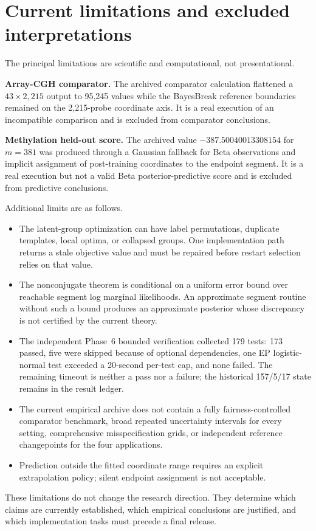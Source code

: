 \section{Current limitations and excluded interpretations}
\label{sec:exec-limitations}

The principal limitations are scientific and computational, not presentational.

\begin{cautionbox}
\textbf{Array-CGH comparator.} The archived comparator calculation flattened a $43\times 2{,}215$ output to 95,245 values while the BayesBreak reference boundaries remained on the 2,215-probe coordinate axis. It is a real execution of an incompatible comparison and is excluded from comparator conclusions.

\textbf{Methylation held-out score.} The archived value $-387.50040013308154$ for $m=381$ was produced through a Gaussian fallback for Beta observations and implicit assignment of post-training coordinates to the endpoint segment. It is a real execution but not a valid Beta posterior-predictive score and is excluded from predictive conclusions.
\end{cautionbox}

Additional limits are as follows.
\begin{itemize}
  \item The latent-group optimization can have label permutations, duplicate templates, local optima, or collapsed groups. One implementation path returns a stale objective value and must be repaired before restart selection relies on that value.
  \item The nonconjugate theorem is conditional on a uniform error bound over reachable segment log marginal likelihoods. An approximate segment routine without such a bound produces an approximate posterior whose discrepancy is not certified by the current theory.
  \item The independent Phase~6 bounded verification collected 179 tests: 173 passed, five were skipped because of optional dependencies, one EP logistic-normal test exceeded a 20-second per-test cap, and none failed. The remaining timeout is neither a pass nor a failure; the historical 157/5/17 state remains in the result ledger.
  \item The current empirical archive does not contain a fully fairness-controlled comparator benchmark, broad repeated uncertainty intervals for every setting, comprehensive misspecification grids, or independent reference changepoints for the four applications.
  \item Prediction outside the fitted coordinate range requires an explicit extrapolation policy; silent endpoint assignment is not acceptable.
\end{itemize}

These limitations do not change the research direction. They determine which claims are currently established, which empirical conclusions are justified, and which implementation tasks must precede a final release.
